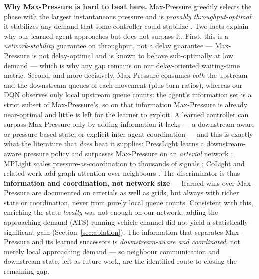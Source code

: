 \textbf{Why Max-Pressure is hard to beat here.} Max-Pressure greedily selects the phase with
the largest instantaneous pressure and is \emph{provably throughput-optimal}: it stabilizes
any demand that some controller could stabilize \cite{MaxPressure_2013}. Two
facts explain why our learned agent approaches but does not surpass it. First, this is a
\emph{network-stability} guarantee on throughput, not a delay guarantee --- Max-Pressure is
not delay-optimal and is known to behave sub-optimally at low demand --- which is why any gap
remains on our delay-oriented waiting-time metric. Second, and more decisively, Max-Pressure
consumes \emph{both} the upstream and the downstream queues of each movement (plus turn
ratios), whereas our DQN observes only local upstream queue counts: the agent's information
set is a strict subset of Max-Pressure's, so on that information Max-Pressure is already
near-optimal and little is left for the learner to exploit. A learned controller can surpass
Max-Pressure only by adding information it lacks --- a downstream-aware or pressure-based
state, or explicit inter-agent coordination --- and this is exactly what the literature that
\emph{does} beat it supplies: PressLight learns a downstream-aware pressure policy and
surpasses Max-Pressure on an \emph{arterial} network \cite{PressLight_2019}; MPLight scales
pressure-as-coordination to thousands of signals \cite{MPLight_2020}; CoLight and related work
add graph attention over neighbours \cite{Colight_2019,CoordinatedDQL_2022}. The
discriminator is thus \textbf{information and coordination, not network size} --- learned wins
over Max-Pressure are documented on arterials as well as grids, but always with richer state or
coordination, never from purely local queue counts. Consistent with this, enriching the state
\emph{locally} was not enough on our network: adding the approaching-demand (ATS) running-vehicle
channel did not yield a statistically significant gain (Section~\ref{sec:ablation}). The
information that separates Max-Pressure and its learned successors is \emph{downstream-aware and
coordinated}, not merely local approaching demand --- so neighbour communication and downstream
state, left as future work, are the identified route to closing the remaining gap.

